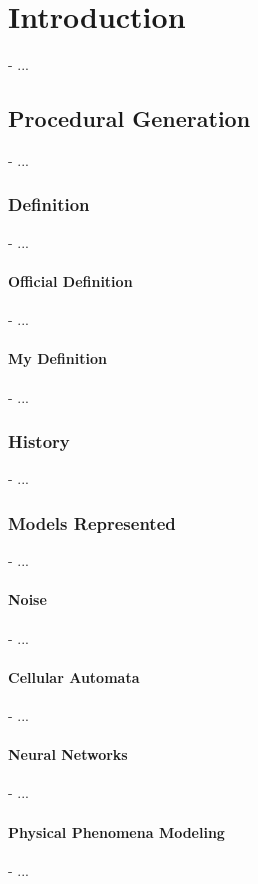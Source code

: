 \chapter{Introduction}
\label{chap:introduction}
\minitoc

- ...

\section{Procedural Generation}
\label{sec:introduction_procedural-generation}
- ...

\subsection{Definition}
- ...

\subsubsection{Official Definition}
- ...

\subsubsection{My Definition}
- ...

\subsection{History}
- ...

\subsection{Models Represented}
- ...

\subsubsection{Noise}
- ...

\subsubsection{Cellular Automata}
- ...

\subsubsection{Neural Networks}
- ...

\subsubsection{Physical Phenomena Modeling}
- ...

